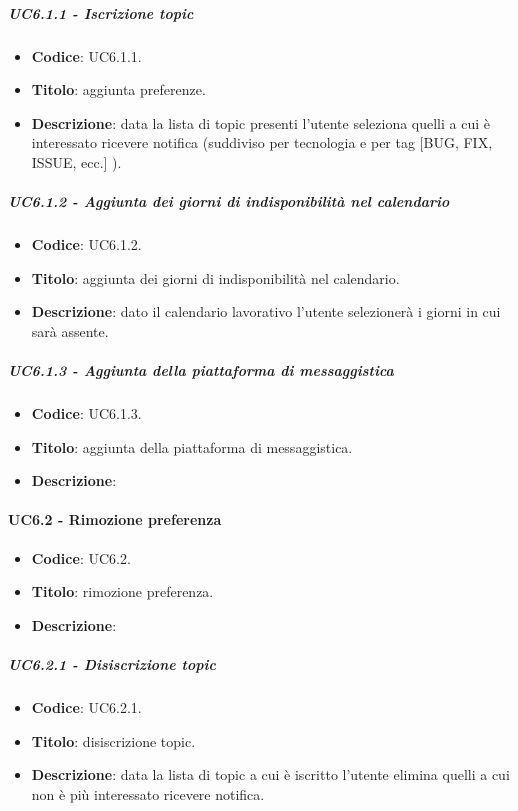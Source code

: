 	\subparagraph{UC6.1.1 - Iscrizione topic}
	\begin{itemize}
		\item \textbf{Codice}: UC6.1.1.
		\item \textbf{Titolo}: aggiunta preferenze.
		\item \textbf{Descrizione}: data la lista di topic presenti l'utente seleziona quelli a cui è interessato ricevere notifica (suddiviso per tecnologia e per tag [BUG, FIX, ISSUE, ecc.] ).
	\end{itemize}
		
			
	\subparagraph{UC6.1.2 - Aggiunta dei giorni di indisponibilità nel calendario} 
	\begin{itemize}
		\item \textbf{Codice}: UC6.1.2.
		\item \textbf{Titolo}: aggiunta dei giorni di indisponibilità nel calendario.
		\item \textbf{Descrizione}: dato il calendario lavorativo l'utente selezionerà i giorni in cui sarà assente.
	\end{itemize}
			
	\subparagraph{UC6.1.3 - Aggiunta della piattaforma di messaggistica}
	\begin{itemize}
		\item \textbf{Codice}: UC6.1.3.
		\item \textbf{Titolo}: aggiunta della piattaforma di messaggistica.
		\item \textbf{Descrizione}: 
	\end{itemize}
			



	\paragraph{UC6.2 - Rimozione preferenza}
	\begin{itemize}
		\item \textbf{Codice}: UC6.2.
		\item \textbf{Titolo}: rimozione preferenza.
		\item \textbf{Descrizione}: 
	\end{itemize}
	
	
	\subparagraph{UC6.2.1 - Disiscrizione topic}
	\begin{itemize}
		\item \textbf{Codice}: UC6.2.1.
		\item \textbf{Titolo}: disiscrizione topic.
		\item \textbf{Descrizione}: data la lista di topic a cui è iscritto l'utente elimina quelli a cui non è più interessato ricevere notifica.
	\end{itemize}
	
